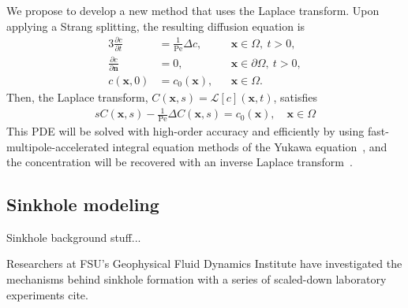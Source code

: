 \documentclass[11pt]{article}
\newcommand{\np}{\newpage \noindent}
\newcommand{\pd}[2]{ \frac{ \partial #1}{ \partial #2 } }
\newcommand{\bvec}[1]{{\mathbf{#1}}}
\newcommand{\Pe}{\mathrm{Pe}}
\newcommand{\xx}{\bvec{x}}
\newcommand{\nn}{{\mathbf{n}}}
\begin{document}
We propose to develop a new method that uses the Laplace transform.
Upon applying a Strang splitting, the resulting diffusion equation is
\begin{alignat}{3}
  \pd{c}{t} &= \frac{1}{\Pe} \Delta c, \quad &&\xx \in \Omega, \: t>0, \\
  \pd{c}{\nn} &= 0, &&\xx \in \partial\Omega, \: t>0, \\
  c(\xx,0) &= c_0(\xx), &&\xx \in \Omega.
\end{alignat}
Then, the Laplace transform, $C(\xx,s) = \mathcal{L}[c](\xx,t)$,
satisfies
\begin{align}
  sC(\xx,s) - \frac{1}{\Pe}\Delta C(\xx,s) = c_0(\xx), 
    \quad \xx \in \Omega
\end{align}
This PDE will be solved with high-order accuracy and efficiently by
using fast-multipole-accelerated integral equation methods of the Yukawa
equation~\cite{kro-qua2011}, and the concentration will be recovered
with an inverse Laplace transform~\cite{jos-war2006}.



\subsection{Sinkhole modeling}

Sinkhole background stuff...

Researchers at FSU's Geophysical Fluid Dynamics Institute have investigated the mechanisms behind sinkhole formation with a series of scaled-down laboratory experiments {\color{blue} cite}.





\np
\end{document}

